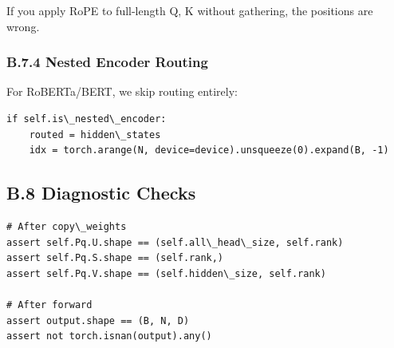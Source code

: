 If you apply RoPE to full-length Q, K without gathering, the positions 
are wrong.

\subsubsection{B.7.4 Nested Encoder Routing}

For RoBERTa/BERT, we skip routing entirely:

\begin{lstlisting}
if self.is\_nested\_encoder:
    routed = hidden\_states
    idx = torch.arange(N, device=device).unsqueeze(0).expand(B, -1)
\end{lstlisting}

\subsection{B.8 Diagnostic Checks}

\begin{lstlisting}
# After copy\_weights
assert self.Pq.U.shape == (self.all\_head\_size, self.rank)
assert self.Pq.S.shape == (self.rank,)
assert self.Pq.V.shape == (self.hidden\_size, self.rank)

# After forward
assert output.shape == (B, N, D)
assert not torch.isnan(output).any()
\end{lstlisting}

